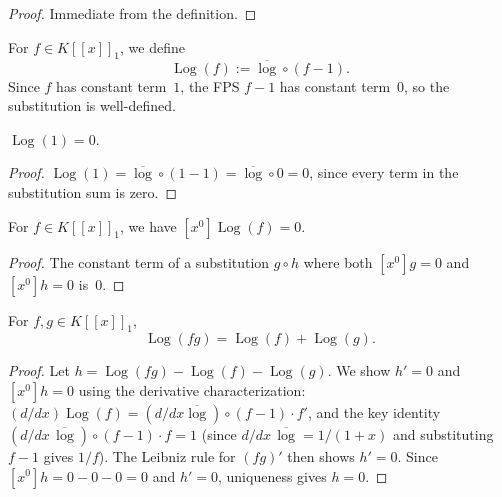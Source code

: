 \begin{proof}
\leanok
Immediate from the definition.
\end{proof}

\begin{definition}
\label{def.fps.fpsLog}
\leanhelper
\leanok
For $f\in K[[x]]_1$, we define
\[
\operatorname{Log}(f) := \overline{\log} \circ (f-1).
\]
Since $f$ has constant term~$1$, the FPS $f-1$ has constant term~$0$,
so the substitution is well-defined.
\end{definition}

\begin{lemma}
\label{lem.fps.fpsLog-one}
\leanhelper
\leanok
$\operatorname{Log}(1) = 0$.
\end{lemma}

\begin{proof}
\leanok
$\operatorname{Log}(1) = \overline{\log}\circ (1-1) = \overline{\log}\circ 0 = 0$,
since every term in the substitution sum is zero.
\end{proof}

\begin{lemma}
\label{lem.fps.constantCoeff-fpsLog}
\leanhelper
\leanok
For $f\in K[[x]]_1$, we have $[x^0]\operatorname{Log}(f)=0$.
\end{lemma}

\begin{proof}
\leanok
The constant term of a substitution $g\circ h$ where both $[x^0]g=0$ and $[x^0]h=0$
is~$0$.
\end{proof}

\begin{theorem}
\label{thm.fps.fpsLog-mul}
\leanhelper
\leanok
For $f,g\in K[[x]]_1$,
\[
\operatorname{Log}(fg) = \operatorname{Log}(f) + \operatorname{Log}(g).
\]
\end{theorem}

\begin{proof}
\leanok
Let $h = \operatorname{Log}(fg) - \operatorname{Log}(f) - \operatorname{Log}(g)$.
We show $h'=0$ and $[x^0]h = 0$ using the derivative characterization:
$(d/dx)\operatorname{Log}(f) = (d/dx \overline{\log})\circ(f-1)\cdot f'$,
and the key identity $(d/dx\,\overline{\log})\circ(f-1)\cdot f = 1$
(since $d/dx\,\overline{\log} = 1/(1+x)$ and substituting $f-1$ gives $1/f$).
The Leibniz rule for $(fg)'$ then shows $h'=0$.
Since $[x^0]h = 0-0-0 = 0$ and $h'=0$, uniqueness gives $h=0$.
\end{proof}

